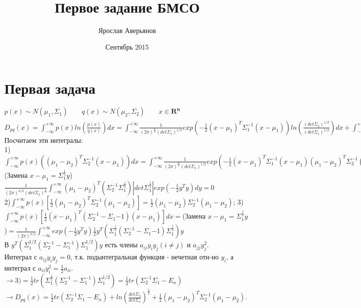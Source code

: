 \documentclass{article}
\title{Первое задание БМСО}
\author{Ярослав Аверьянов}
\date{Сентябрь 2015}
\begin{document}
\maketitle

\section{Первая задача}
$p(x) \sim N(\mu_1,\Sigma_1) \qquad q(x) \sim N(\mu_2,\Sigma_2) \qquad x \in \mathbf{R^n}$\\
$D_{pq}(x) = \int_{-\infty}^{+\infty} p(x)ln(\frac{p(x)}{q(x)})dx = \int_{-\infty}^{+\infty}\frac{1}{(2\pi)^{\frac{n}{2}}(det\Sigma_1)^{1/2}} exp(-\frac{1}{2}(x-\mu_1)^{T}\Sigma_1^{-1}(x-\mu_1))ln(\frac{(det\Sigma_2)^{1/2}}{(det\Sigma_1)^{1/2}})dx + \int_{-\infty}^{+\infty} \frac{exp(-\frac{1}{2}(x-\mu_1)^{T}\Sigma_1^{-1}(x-\mu_1))}{(2\pi)^{n/2}(det\Sigma_1)^{1/2}}[\frac{1}{2}(x-\mu_2)^{T}\Sigma_2^{-1}(x-\mu_2) - \frac{1}{2}(x-\mu_1)^{T}\Sigma_1^{-1}(x-\mu_1)]dx = ln(\frac{det\Sigma_2}{det\Sigma_1})^{1/2} + \int_{-\infty}^{+\infty}p(x)[\frac{1}{2}(x-\mu_1)^{T}(\Sigma_2^{-1} - \Sigma_1^{-1})(x-\mu_1) + (\mu_1 - \mu_2)^{T}\Sigma_2^{-1}(x-\mu_1) + \frac{1}{2}(\mu_1 - \mu_2)^{T}\Sigma_2^{-1}(\mu_1 - \mu_2)]dx$\\
Посчитаем эти интегралы:\\
1)$\int_{-\infty}^{+\infty} p(x)((\mu_1 - \mu_2)^{T}\Sigma_2^{-1}(x-\mu_1))dx = \int_{-\infty}^{+\infty}\frac{1}{(2\pi)^{\frac{n}{2}}(det\Sigma_1)^{1/2}}exp(-\frac{1}{2}(x-\mu_1)^{T}\Sigma_1^{-1}(x-\mu_1)(\mu_1-\mu_2)^{T}\Sigma_2^{-1}(x-\mu_1))dx = $(Замена $ x-\mu_1 = \Sigma_1^{\frac{1}{2}}y$)$ \frac{1}{(2\pi)^{n/2}(det\Sigma_1)^{\frac{1}{2}}}\int_{-\infty}^{+\infty} (\mu_1 - \mu_2)^{T}(\Sigma_2^{-1}\Sigma_1^{\frac{1}{2}})|det\Sigma_1^{\frac{1}{2}}|exp(-\frac{1}{2}y^{T}y)dy = 0$\\
2)$\int_{-\infty}^{+\infty} p(x)[\frac{1}{2}(\mu_1 - \mu_2)^T\Sigma_2^{-1}(\mu_1 - \mu_2)] = \frac{1}{2}(\mu_1 - \mu_2)\Sigma_2^{-1}(\mu_1 - \mu_2)$;
3)$\int_{-\infty}^{+\infty} p(x)[\frac{1}{2}(x-\mu_1)^{T}(\Sigma_2^{-1} - \Sigma_1{-1})(x-\mu_1)]dx = $(Замена $ x - \mu_1 = \Sigma_1^{\frac{1}{2}}y$)$ = \frac{1}{(2\pi)^{n/2}}\int_{-\infty}^{+\infty} exp(-\frac{1}{2}y^{T}y)\frac{1}{2}y^{T}(\Sigma_1^{\frac{1}{2}}(\Sigma_2^{-1} - \Sigma_1{-1})\Sigma_1^{\frac{1}{2}})y$\\
В $ y^{T}(\Sigma_1^{1/2}(\Sigma_2^{-1} - \Sigma_1^{-1})\Sigma_1^{1/2})y$ есть члены $a_{ij}y_iy_j(i\neq j)$ и $a_{jj}y_j^2$.\\
Интеграл с $a_{ij} y_i y_j = 0$, т.к. подынтегральная функция - нечетная отн-но $y_i$, а интеграл с $a_{ii} y_i^2 = \frac{1}{2} a_{ii}$.\\
$\to 3) = \frac{1}{2}tr(\Sigma_1^{\frac{1}{2}}(\Sigma_2^{-1} - \Sigma_1^{-1})\Sigma_1^{1/2}) = \frac{1}{2}tr(\Sigma_2^{-1}\Sigma_1 - E_n)$\\
$\to D_{pq}(x) = \frac{1}{2}tr(\Sigma_2^{-1}\Sigma_1 - E_n) + ln(\frac{det\Sigma_2}{det\Sigma_1})^{\frac{1}{2}} + \frac{1}{2}(\mu_1 - \mu_2)^{T}\Sigma_2^{-1}(\mu_1 - \mu_2).$
\end{document}

